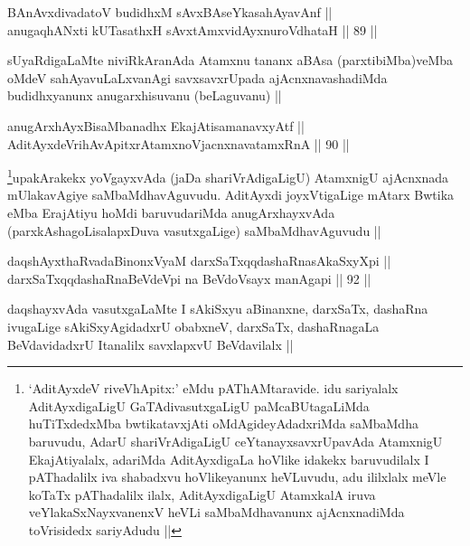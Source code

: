 \begin{shl}
BAnAvxdivadatoV budidhxM sAvxBAseYkasahAyavAnf || \\
anugaqhANxti kUTasathxH sAvxtAmxvidAyxnuroVdhataH ||  89 ||  
\end{shl}

\begin{artha}
sUyaRdigaLaMte niviRkAranAda Atamxnu tananx aBAsa (parxtibiMba)veMba oMdeV sahAyavuLaLxvanAgi savxsavxrUpada ajAcnxnavashadiMda budidhxyanunx anugarxhisuvanu (beLaguvanu) ||
\end{artha}


\begin{shl}
anugArxhAyxBisaMbanadhx EkajAtisamanavxyAtf ||  \\
AditAyxdeVrihAvApitxrAtamxnoV\s jacnxnavatamxRnA ||  90 ||  
\end{shl}

\begin{artha}
\footnote{`AditAyxdeV riveVhApitx:' eMdu pAThAMtaravide. idu sariyalalx AditAyxdigaLigU GaTAdivasutxgaLigU paMcaBUtagaLiMda huTiTxdedxMba bwtikatavxjAti oMdAgideyAdadxriMda saMbaMdha baruvudu, AdarU shariVrAdigaLigU ceYtanayxsavxrUpavAda AtamxnigU EkajAtiyalalx, adariMda AditAyxdigaLa hoVlike idakekx baruvudilalx I pAThadalilx iva shabadxvu hoVlikeyanunx heVLuvudu, adu ililxlalx meVle koTaTx pAThadalilx ilalx, AditAyxdigaLigU AtamxkalA iruva veYlakaSxNayxvanenxV heVLi saMbaMdhavanunx ajAcnxnadiMda toVrisidedx sariyAdudu ||}upakArakekx yoVgayxvAda (jaDa shariVrAdigaLigU) AtamxnigU ajAcnxnada mUlakavAgiye saMbaMdhavAguvudu. AditAyxdi joyxVtigaLige mAtarx Bwtika eMba ErajAtiyu hoMdi baruvudariMda anugArxhayxvAda (parxkAshagoLisalapxDuva vasutxgaLige) saMbaMdhavAguvudu ||
\end{artha}


\begin{shl}
daqshAyxthaRvadaBinonxV\s yaM darxSaTxqqdashaRnasAkaSxyXpi || \\
darxSaTxqqdashaRnaBeVdeV\s pi na BeVdoV\s sayx manAgapi ||  92 ||  
\end{shl}

\begin{artha}
daqshayxvAda vasutxgaLaMte I sAkiSxyu aBinanxne, darxSaTx, dashaRna ivugaLige sAkiSxyAgidadxrU obabxneV, darxSaTx, dashaRnagaLa BeVdavidadxrU Itanalilx savxlapxvU BeVdavilalx ||
\end{artha}

